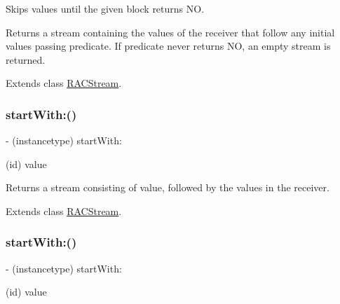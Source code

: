 Skips values until the given block returns {\ttfamily NO}.

Returns a stream containing the values of the receiver that follow any initial values passing {\ttfamily predicate}. If {\ttfamily predicate} never returns {\ttfamily NO}, an empty stream is returned. 

Extends class \mbox{\hyperlink{interface_r_a_c_stream_a1e323c308071aed5e01627d4d96ca9c8}{R\+A\+C\+Stream}}.

\mbox{\label{category_r_a_c_stream_07_operations_08_a2f255fad695085b91a1ebc1e0a78c865}} 
\subsubsection{\texorpdfstring{start\+With\+:()}{startWith:()}\hspace{0.1cm}{\footnotesize\ttfamily [1/3]}}
{\footnotesize\ttfamily -\/ (instancetype) start\+With\+: \begin{DoxyParamCaption}\item[{(id)}]{value }\end{DoxyParamCaption}}

Returns a stream consisting of {\ttfamily value}, followed by the values in the receiver. 

Extends class \mbox{\hyperlink{interface_r_a_c_stream_a2f255fad695085b91a1ebc1e0a78c865}{R\+A\+C\+Stream}}.

\mbox{\label{category_r_a_c_stream_07_operations_08_a2f255fad695085b91a1ebc1e0a78c865}} 
\subsubsection{\texorpdfstring{start\+With\+:()}{startWith:()}\hspace{0.1cm}{\footnotesize\ttfamily [2/3]}}
{\footnotesize\ttfamily -\/ (instancetype) start\+With\+: \begin{DoxyParamCaption}\item[{(id)}]{value }\end{DoxyParamCaption}}


